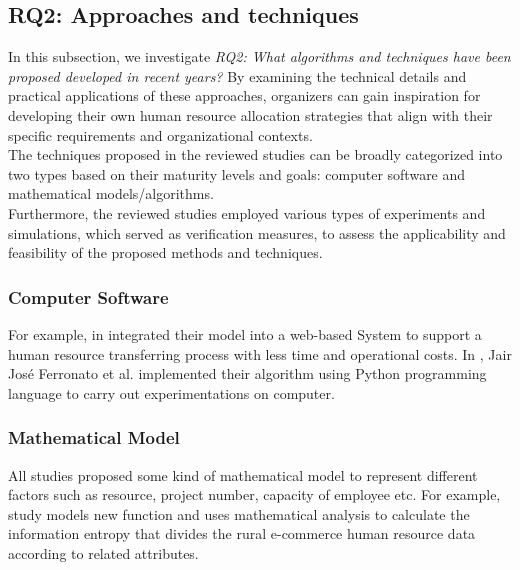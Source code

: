 \documentclass[runningheads]{llncs}
\begin{document}
\subsection{RQ2: Approaches and techniques}
In this subsection, we investigate \emph{RQ2: What algorithms and techniques have been proposed developed in recent years?} By examining the technical details and practical applications of these approaches, organizers can gain inspiration for developing their own human resource allocation strategies that align with their specific requirements and organizational contexts.\\
The techniques proposed in the reviewed studies can be broadly categorized into two types based on their maturity levels and goals: computer software and mathematical models/algorithms.\\
Furthermore, the reviewed studies employed various types of experiments and simulations, which served as verification measures, to assess the applicability and feasibility of the proposed methods and techniques. \\
\begin{figure}
\end{figure}

\subsubsection{Computer Software}
For example, in \cite{study18} integrated their model into a web-based System to support a human resource transferring process with less time and operational costs. In \cite{study8}, Jair José Ferronato et al. implemented their algorithm using Python programming language to carry out experimentations on computer.
\subsubsection{Mathematical Model}
All studies proposed some kind of mathematical model to represent different factors such as resource, project number, capacity of employee etc. For example, study \cite{study15} models new function and uses mathematical analysis to calculate the information entropy that divides the rural e-commerce human resource data according to related attributes.
\end{document}
